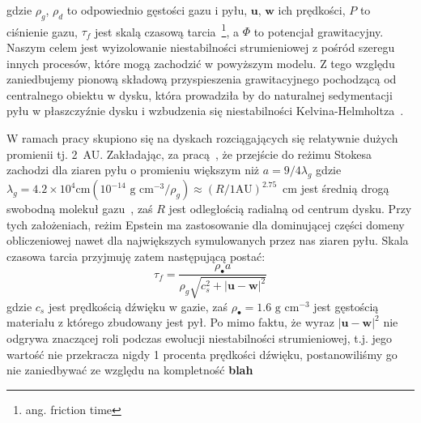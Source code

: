 \noindent gdzie $\rho_g$, $\rho_d$ to odpowiednio gęstości gazu i pyłu,
$\mathbf{u}$, $\mathbf{w}$ ich prędkości, $P$ to ciśnienie gazu, $\tau_f$ jest
skalą czasową tarcia~\footnote{ang. friction time}, a $\Phi$ to potencjał
grawitacyjny. Naszym celem jest wyizolowanie niestabilności strumieniowej z
pośród szeregu innych procesów, które mogą zachodzić w powyższym modelu. Z tego
względu zaniedbujemy pionową składową przyspieszenia grawitacyjnego pochodzącą
od centralnego obiektu w dysku, która prowadziła by do naturalnej sedymentacji
pyłu w płaszczyźnie dysku i wzbudzenia się niestabilności
Kelvina-Helmholtza~\cite{JHK06}.

W ramach pracy skupiono się na dyskach rozciągających się relatywnie dużych
promienii tj. 2~AU. Zakładając, za pracą~\cite{CD93}, że przejście do
reżimu Stokesa zachodzi dla ziaren pyłu o promieniu większym niż
$a = 9/4\lambda_g$ gdzie $\lambda_g = 4.2\times 10^4\textrm{
cm} (10^{-14}\textrm{ g cm}^{-3}/\rho_g) \approx (R/1 \textrm{AU})^{2.75}$~cm 
jest średnią drogą swobodną molekuł gazu~\citep{W77,BT09}, zaś $R$ jest
odległością radialną od centrum dysku. Przy tych założeniach, reżim Epstein ma
zastosowanie dla dominującej części domeny obliczeniowej nawet dla największych
symulowanych przez nas ziaren pyłu. Skala czasowa tarcia przyjmuję zatem
następującą postać:
%
\begin{equation}
   \tau_f = \frac{\rho_\bullet a} 
      {\rho_g \sqrt{c_s^2 + |\mathbf{u} - \mathbf{w}|^2 }}
   \label{eq:tauf} 
\end{equation}
%
gdzie $c_s$ jest prędkością dźwięku w gazie, zaś $\rho_\bullet = 1.6\textrm{ g cm}^{-3}$
jest gęstością materiału z którego zbudowany jest pył. Po mimo faktu, że wyraz
$|\mathbf{u}-\mathbf{w}|^2$ nie odgrywa znaczącej roli podczas ewolucji
niestabilności strumieniowej, t.j. jego wartość nie przekracza nigdy 1 procenta
prędkości dźwięku, postanowiliśmy go nie zaniedbywać ze względu na
kompletność {\bf blah}
%
